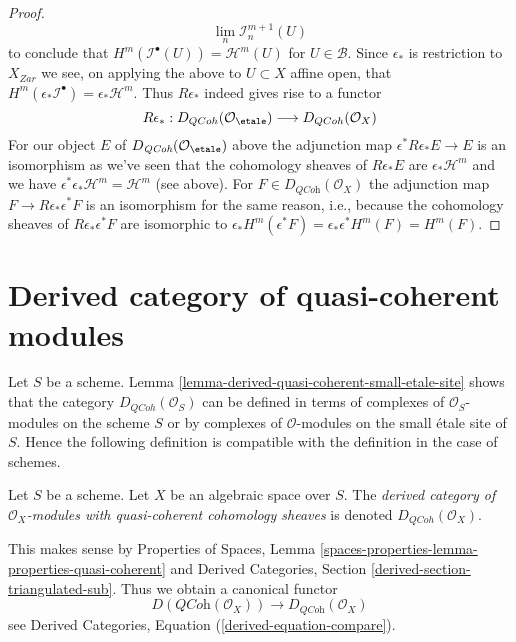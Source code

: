 \begin{proof}
$$\lim_n \mathcal{I}_n^{m + 1}(U)
$$
to conclude that $H^m(\mathcal{I}^\bullet(U)) = \mathcal{H}^m(U)$ for
$U \in \mathcal{B}$. Since $\epsilon_*$ is restriction
to $X_{Zar}$ we see, on applying the above to $U \subset X$
affine open, that
$H^m(\epsilon_*\mathcal{I}^\bullet) = \epsilon_*\mathcal{H}^m$.
Thus $R\epsilon_*$ indeed gives rise to a functor
$$
R\epsilon_* :
D_{QCoh}(\mathcal{O}_\etale)
\longrightarrow
D_{QCoh}(\mathcal{O}_X)
$$
For our object $E$ of $D_{\textit{QCoh}}(\mathcal{O}_\etale)$ above
the adjunction map $\epsilon^*R\epsilon_*E \to E$
is an isomorphism as we've seen that the cohomology sheaves
of $R\epsilon_*E$ are $\epsilon_*\mathcal{H}^m$ and we have
$\epsilon^*\epsilon_*\mathcal{H}^m = \mathcal{H}^m$ (see above).
For $F \in D_{\textit{QCoh}}(\mathcal{O}_X)$ the
adjunction map $F \to R\epsilon_*\epsilon^*F$
is an isomorphism for the same reason, i.e., because
the cohomology sheaves of $R\epsilon_*\epsilon^*F$
are isomorphic to
$\epsilon_*H^m(\epsilon^*F) = \epsilon_*\epsilon^*H^m(F) = H^m(F)$.
\end{proof}










\section{Derived category of quasi-coherent modules}
\label{section-derived-quasi-coherent}

\noindent
Let $S$ be a scheme. Lemma
\ref{lemma-derived-quasi-coherent-small-etale-site}
shows that the category $D_{QCoh}(\mathcal{O}_S)$ can be defined
in terms of complexes of $\mathcal{O}_S$-modules on the scheme $S$
or by complexes of $\mathcal{O}$-modules on the small \'etale site
of $S$. Hence the following definition is compatible with the definition
in the case of schemes.

\begin{definition}
\label{definition-derived-quasi-coherent}
Let $S$ be a scheme. Let $X$ be an algebraic space over $S$.
The {\it derived category of $\mathcal{O}_X$-modules with
quasi-coherent cohomology sheaves} is denoted
$D_{QCoh}(\mathcal{O}_X)$.
\end{definition}

\noindent
This makes sense by
Properties of Spaces, Lemma
\ref{spaces-properties-lemma-properties-quasi-coherent}
and
Derived Categories, Section \ref{derived-section-triangulated-sub}.
Thus we obtain a canonical functor
\begin{equation}
\label{equation-compare}
D(\textit{QCoh}(\mathcal{O}_X))
\longrightarrow
D_{\textit{QCoh}}(\mathcal{O}_X)
\end{equation}
see Derived Categories, Equation (\ref{derived-equation-compare}).

